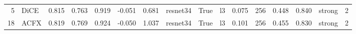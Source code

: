 \begin{tabular}{rlrrrrrlllrlrrlr}
     5 &   DiCE &           0.815 &    0.763 &       0.919 &                         -0.051 &                0.681 &        resnet34 &               True &                l3 &                          0.075 &                   256 &                      0.448 &                       0.840 &                       strong &        2 \\
    18 &   ACFX &           0.819 &    0.769 &       0.924 &                         -0.050 &                1.037 &        resnet34 &               True &                l3 &                          0.101 &                   256 &                      0.455 &                       0.830 &                       strong &        2 \\
\bottomrule
\end{tabular}
